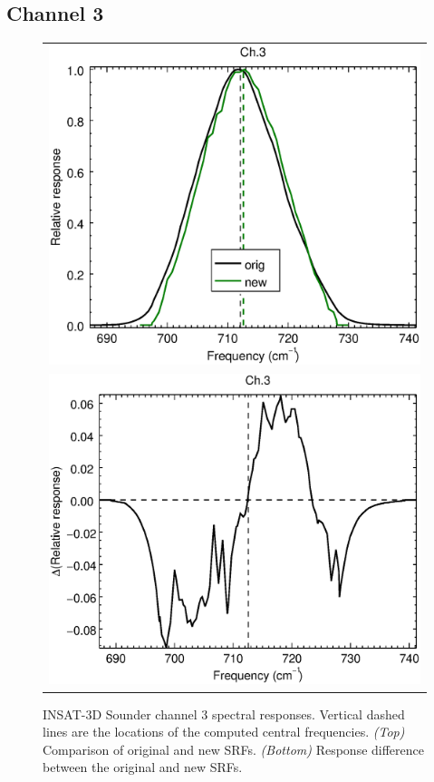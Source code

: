 \subsection{Channel 3}
\begin{figure}[H]
  \centering
  \begin{tabular}{c}
    \includegraphics[scale=0.55]{graphics/sndr/srf/sndr_insat3d-3.eps} \\
    \includegraphics[scale=0.55]{graphics/sndr/srf/sndr_insat3d-3.difference.eps}
  \end{tabular}
  \caption{INSAT-3D Sounder channel 3 spectral responses. Vertical dashed lines are the locations of the computed central frequencies. \emph{(Top)} Comparison of original and new SRFs. \emph{(Bottom)} Response difference between the original and new SRFs.}
  \label{fig:sndr_ch3}
\end{figure}

